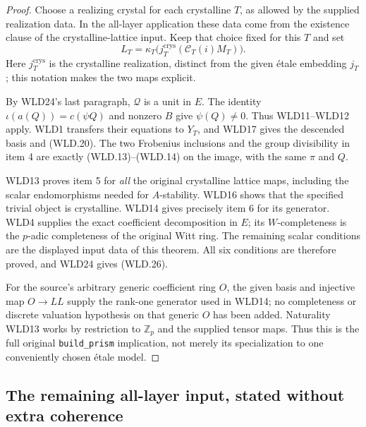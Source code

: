 \begin{proof}
Choose a realizing crystal for each crystalline $T$, as allowed
by the supplied realization data. In the all-layer application
these data come from the existence clause of the crystalline-lattice
input. Keep that choice fixed for this $T$ and set
\[
             L_T=\kappa_T\bigl(j_T^{\mathrm{crys}}
                                  (\mathcal C_T(i)M_T)\bigr).
\]
Here $j_T^{\mathrm{crys}}$ is the crystalline realization, distinct
from the given \'etale embedding $j_T$; this notation makes the
two maps explicit.

By WLD24's last paragraph, $\mathcal Q$ is a unit in $E$.
The identity $\iota(a(Q))=c(\psi Q)$ and nonzero $B$
give $\psi(Q)\ne0$. Thus WLD11--WLD12 apply.
WLD1 transfers their equations to $Y_T$, and WLD17 gives
the descended basis and (WLD.20). The two Frobenius inclusions
and the group divisibility in item 4 are exactly (WLD.13)--(WLD.14)
on the image, with the same $\pi$ and $Q$.

WLD13 proves item 5 for \emph{all} the original crystalline
lattice maps, including the scalar endomorphisms needed for
$A$-stability. WLD16 shows that the specified trivial object
is crystalline. WLD14 gives precisely item 6 for its generator.
WLD4 supplies the exact coefficient decomposition in $E$;
its $W$-completeness is the $p$-adic completeness of the original
Witt ring. The remaining scalar conditions are the displayed
input data of this theorem. All six conditions are therefore
proved, and WLD24 gives (WLD.26).

For the source's arbitrary generic coefficient ring $O$, the given
basis and injective map $O\to LL$ supply the rank-one generator
used in WLD14; no completeness or discrete valuation hypothesis
on that generic $O$ has been added. Naturality WLD13 works by
restriction to $\mathbb Z_p$ and the supplied tensor maps.
Thus this is the full original \texttt{build\_\allowbreak prism} implication,
not merely its specialization to one conveniently chosen \'etale model.
\end{proof}

\subsection{The remaining all-layer input, stated without extra coherence}


